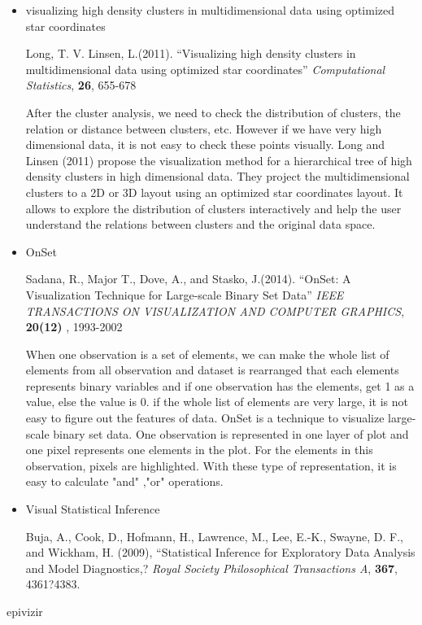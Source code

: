 \documentclass{article}
\begin{document}
\begin{itemize}
\item visualizing high density clusters in multidimensional data using optimized star coordinates

Long, T. V. Linsen, L.(2011).
``Visualizing high density clusters in multidimensional
data using optimized star coordinates''
{\em Computational Statistics}, {\bf 26}, 655-678

After the cluster analysis, we need to check the distribution of clusters, the relation or distance between clusters, etc. However if we have very high dimensional data, it is not easy to check these points visually. Long and Linsen (2011) propose the visualization method for a hierarchical tree of high density clusters in high dimensional data. They project the multidimensional clusters to a 2D or 3D layout using an optimized star coordinates layout. It allows to explore the distribution of clusters interactively and help the user understand the relations between clusters and the original data space.

\item OnSet

Sadana, R., Major T., Dove, A., and Stasko, J.(2014).
``OnSet: A Visualization Technique for Large-scale Binary Set Data''
{\em IEEE TRANSACTIONS ON VISUALIZATION AND COMPUTER GRAPHICS}, {\bf 20(12)} , 1993-2002

When one observation is a set of elements, we can make the whole list of elements from all observation and dataset is rearranged that each elements represents binary variables and if one observation has the elements, get 1 as a value, else the value is 0. if the whole list of elements are very large, it is not easy to figure out the features of data.
OnSet is a technique to visualize large-scale binary set data. One observation is represented in one layer of plot and one pixel represents one elements in the plot. For the elements in this observation, pixels are highlighted. With these type of representation, it is easy to calculate "and" ,"or" operations.

\item Visual Statistical Inference

Buja, A., Cook, D., Hofmann, H., Lawrence, M., Lee, E.-K., Swayne, D. F., and Wickham, H. (2009), ``Statistical Inference for Exploratory Data Analysis and Model Diagnostics,? {\em Royal Society Philosophical Transactions A}, {\bf 367}, 4361?4383.


\end{itemize}

epivizir
\end{document}
